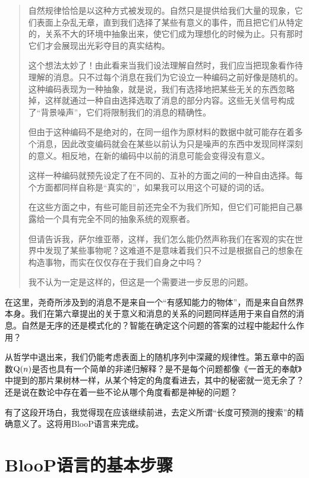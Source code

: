 \begin{quote}
\begin{description}[wide,labelsep=\ccwd,format=\sffamily\itemcolon]
自然规律恰恰是以这种方式被发现的。自然只是提供给我们大量的现象，它们表面上杂乱无章，直到我们选择了某些有意义的事件，而且把它们从特定的，关系不大的环境中抽象出来，使它们成为理想化的时候为止。只有那时它们才会展现出光彩夺目的真实结构。

\item[萨哲杜]这个想法太妙了！由此看来当我们设法理解自然时，我们应当把现象看作待理解的消息。只不过每个消息在我们为它设立一种编码之前好像是随机的。这种编码表现为一种抽象，就是说，我们有选择地把某些无关的东西忽略掉，这样就通过一种自由选择选取了消息的部分内容。这些无关信号构成了“背景噪声”，它们将限制我们的消息的精确性。

    但由于这种编码不是绝对的，在同一组作为原材料的数据中就可能存在着多个消息，因此改变编码就会在某些以前认为只是噪声的东西中发现同样深刻的意义。相反地，在新的编码中以前的消息可能会变得没有意义。

    这样一种编码就预先设定了在不同的、互补的方面之间的一种自由选择。每个方面都同样自称是“真实的”，如果我可以用这个可疑的词的话。

    在这些方面之中，有些可能目前还完全不为我们所知，但它们可能把自己暴露给一个具有完全不同的抽象系统的观察者。

    但请告诉我，萨尔维亚蒂，这样，我们怎么能仍然声称我们在客观的实在世界中发现了某些事物呢？这难道不是意味着我们只不过是根据自己的想象在构造事物，而实在仅仅存在于我们自身之中吗？

\item[萨尔维亚蒂]我不认为一定是这样的，但这是一个需要进一步反思的问题。
\end{description}
\end{quote}

在这里，尧奇所涉及到的消息不是来自一个“有感知能力的物体”，而是来自自然界本身。我们在第六章提出的关于意义和消息的关系的问题同样适用于来自自然的消息。自然是无序的还是模式化的？智能在确定这个问题的答案的过程中能起什么作用？

从哲学中退出来，我们仍能考虑表面上的随机序列中深藏的规律性。第五章中的函数$\operatorname{Q}(n)$是否也具有一个简单的非递归解释？是不是每个问题都像《一首无的奉献》中提到的那片果树林一样，从某个特定的角度看进去，其中的秘密就一览无余了？还是说在数论中存在着一些不论从哪个角度看都是神秘的问题？

有了这段开场白，我觉得现在应该继续前进，去定义所谓“长度可预测的搜索”的精确意义了。这将用BlooP语言来完成。

\section{BlooP语言的基本步骤}

